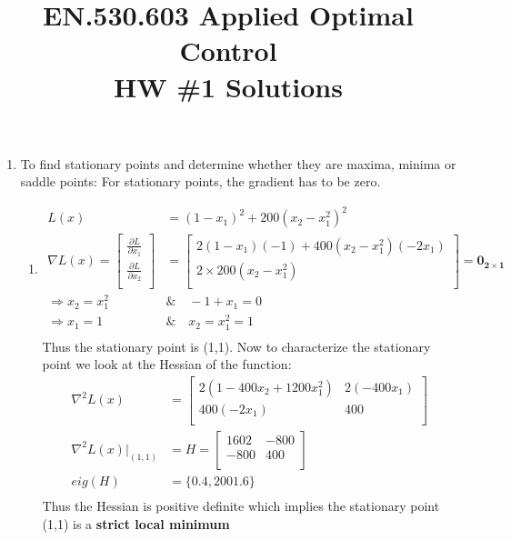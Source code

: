 
\title{EN.530.603 Applied Optimal Control \\HW \#1 Solutions}
\graphicspath{{./figures/}}

\maketitle

\begin{enumerate}

\item To find stationary points and determine whether they are maxima, minima or
saddle points:
  For stationary points, the gradient has to be zero.
  \begin{enumerate}
   \item  %
   \begin{align*}
      L(x) &= (1-x_1)^2 + 200(x_2 - x_1^2)^2 \\[6pt]
      \nabla L(x) = \begin{bmatrix}
			  \frac{\partial L}{\partial x_1} \\[6pt]
			  \frac{\partial L}{\partial x_2} \\
			  \end{bmatrix}  &= 
			  \begin{bmatrix}
			    2(1-x_1)(-1) + 400(x_2 - x_1^2)(-2x_1) \\
			    2\times 200 (x_2 -x_1^2)\\
			    \end{bmatrix}  = \mathbf{0_{2\times1}}\\[6pt]
	\Rightarrow x_2 = x_1^2 \quad &	\& \quad -1+x_1 = 0\\
	\Rightarrow x_1 = 1 \quad & \& \quad x_2 = x_1^2 = 1 \\
   \end{align*}
   Thus the stationary point is (1,1). Now to characterize the stationary point
we look at the Hessian of the function:
   \begin{align*}
    \nabla^2 L(x) &= \begin{bmatrix}
                     2\left( 1 - 400 x_2 + 1200 x_1^2\right) & 2 (-400 x_1) \\
                     400(-2 x_1) & 400 \\
                    \end{bmatrix}\\[6pt]
     \nabla^2 L(x) |_{(1,1)} &= H =  \begin{bmatrix}
                                1602 & -800 \\
                                -800 & 400 \\
                               \end{bmatrix}\\
      eig(H) &= \{0.4, 2001.6\}\\
   \end{align*}
   Thus the Hessian is positive definite which implies the stationary point
(1,1) is a \textbf{strict local minimum}
   

\end{enumerate}
\end{enumerate}
